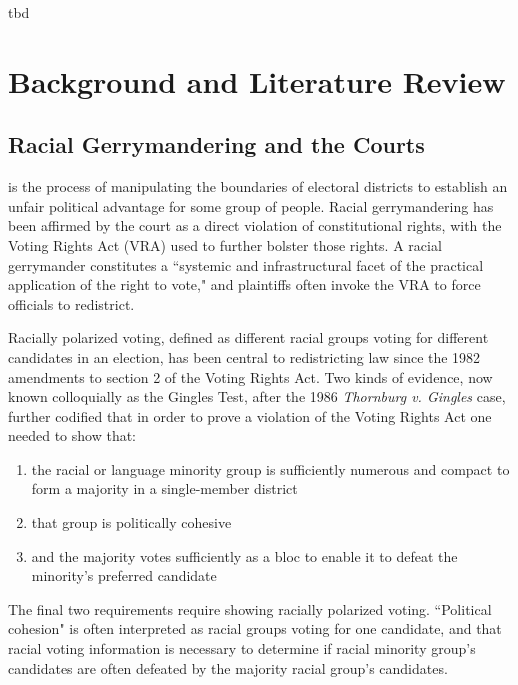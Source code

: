 \begin{savequote}[75mm]
tbd
\end{savequote}

\chapter{Background and Literature Review}

\section{Racial Gerrymandering and the Courts}

 is the process of manipulating the boundaries of electoral districts to establish an unfair political advantage for some group of people. Racial gerrymandering has been affirmed by the court as a direct violation of constitutional rights, with the Voting Rights Act (VRA) used to further bolster those rights. A racial gerrymander constitutes a ``systemic and infrastructural facet of the practical application of the right to vote,"\cite{greiner} and plaintiffs often invoke the VRA to force officials to redistrict.

Racially polarized voting, defined as different racial groups voting for different candidates in an election, has been central to redistricting law since the 1982 amendments to section 2 of the Voting Rights Act.\cite{greiner} Two kinds of evidence, now known colloquially as the Gingles Test, after the 1986 \textit{Thornburg v. Gingles}\cite{thornburg} case, further codified that in order to prove a violation of the Voting Rights Act one needed to show that:

\begin{enumerate}
 \item the racial or language minority group is sufficiently numerous and compact to form a majority in a single-member district
 \item that group is politically cohesive
 \item and the majority votes sufficiently as a bloc to enable it to defeat the minority’s preferred candidate
\end{enumerate}

The final two requirements require showing racially polarized voting. ``Political cohesion" is often interpreted as racial groups voting for one candidate, and that racial voting information is necessary to determine if racial minority group's candidates are often defeated by the majority racial group's candidates.

